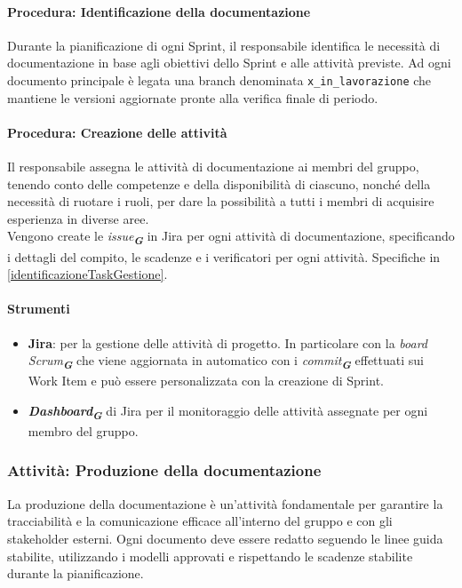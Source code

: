 \documentclass[a4paper,12pt]{article}
\newcommand{\glossario}[1]{\textit{#1}\textsubscript{\textbf{\textit{\textcolor{lightblack}{G}}}}}
\begin{document}
\paragraph{Procedura: Identificazione della documentazione}\label{procedurePianificaDocs}
Durante la pianificazione di ogni Sprint, il responsabile identifica le
necessità di documentazione in base agli obiettivi dello Sprint e alle attività
previste. Ad ogni documento principale è legata una branch denominata
\texttt{x\_in\_lavorazione} che mantiene le versioni aggiornate pronte alla
verifica finale di periodo.

\paragraph{Procedura: Creazione delle attività}
Il responsabile assegna le attività di documentazione ai membri del gruppo,
tenendo conto delle competenze e della disponibilità di ciascuno, nonché della
necessità di ruotare i ruoli, per dare la possibilità a tutti i membri di
acquisire esperienza in diverse aree.\\ Vengono create le \glossario{issue} in
Jira per ogni attività di documentazione, specificando i dettagli del compito,
le scadenze e i verificatori per ogni attività. Specifiche in
\ref{identificazioneTaskGestione}.

\paragraph{Strumenti}
\begin{itemize}
    \item \textbf{Jira}: per la gestione delle attività di progetto. In particolare con la
          \glossario{board Scrum} che viene aggiornata in automatico con i
          \glossario{commit} effettuati sui Work Item e può essere personalizzata con la
          creazione di Sprint.
    \item \glossario{\textbf{Dashboard}} di Jira per il monitoraggio delle attività assegnate per ogni membro del gruppo.
\end{itemize}

\subsubsection{Attività: Produzione della documentazione}\label{produzioneDocs}
La produzione della documentazione è un'attività fondamentale per garantire la
tracciabilità e la comunicazione efficace all'interno del gruppo e con gli
stakeholder esterni. Ogni documento deve essere redatto seguendo le linee guida
stabilite, utilizzando i modelli approvati e rispettando le scadenze stabilite
durante la pianificazione.
\end{document}
